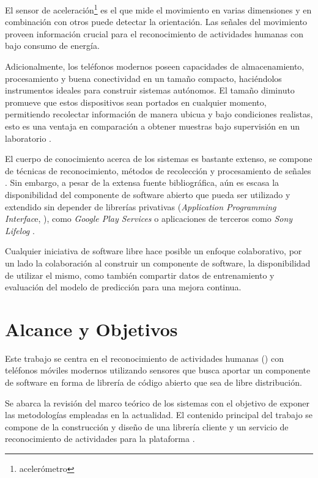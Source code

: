 El sensor de aceleración\footnote{acelerómetro} es el que mide el
movimiento en varias dimensiones y en combinación con otros puede
detectar la orientación. Las señales del movimiento proveen información
crucial para el reconocimiento de actividades humanas con bajo consumo
de energía.

Adicionalmente, los teléfonos modernos poseen capacidades de almacenamiento,
procesamiento y buena conectividad en un tamaño compacto, haciéndolos
instrumentos ideales para construir sistemas autónomos. El tamaño
diminuto promueve que estos dispositivos sean portados en cualquier
momento, permitiendo recolectar información de manera ubicua y bajo
condiciones realistas, esto es una ventaja en comparación a obtener
muestras bajo supervisión en un laboratorio \cite{Bao2004}. 

El cuerpo de conocimiento acerca de los sistemas  es bastante
extenso, se compone de técnicas de reconocimiento, métodos de recolección
y procesamiento de señales \cite{LaraLabrador2012,Kwapisz2011}. Sin
embargo, a pesar de la extensa fuente bibliográfica, aún es escasa
la disponibilidad del componente de software abierto que pueda ser
utilizado y extendido sin depender de librerías privativas (\emph{Application
Programming Interfac}e, ), como \emph{Google Play Services}
\cite{Google2016l} o aplicaciones de terceros como \emph{Sony Lifelog}
\cite{Sony2016l}.

Cualquier iniciativa de software libre hace posible un enfoque colaborativo,
por un lado la colaboración al construir un componente de software,
la disponibilidad de utilizar el mismo, como también compartir datos
de entrenamiento y evaluación del modelo de predicción para una mejora
continua.

\section{Alcance y Objetivos}

\label{sec13:alcance-y-objetivos}Este trabajo se centra en el reconocimiento
de actividades humanas () con teléfonos móviles modernos
utilizando sensores que busca aportar un componente de software en
forma de librería de código abierto que sea de libre distribución. 

Se abarca la revisión del marco teórico de los sistemas 
con el objetivo de exponer las metodologías empleadas en la actualidad.
El contenido principal del trabajo se compone de la construcción y
diseño de una librería cliente y un servicio de reconocimiento de
actividades para la plataforma \emph{}. 

